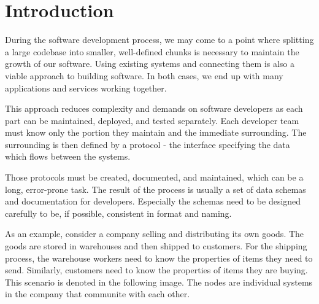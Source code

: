 \chapter*{Introduction}

During the software development process, we may come to a point where splitting a large codebase into smaller, well-defined chunks is necessary to maintain the growth of our software. Using existing systems and connecting them is also a viable approach to building software. In both cases, we end up with many applications and services working together.

This approach reduces complexity and demands on software developers as each part can be maintained, deployed, and tested separately. Each developer team must know only the portion they maintain and the immediate surrounding. The surrounding is then defined by a protocol - the interface specifying the data which flows between the systems.

Those protocols must be created, documented, and maintained, which can be a long, error-prone task. The result of the process is usually a set of data schemas and documentation for developers. Especially the schemas need to be designed carefully to be, if possible, consistent in format and naming.

\bigskip

As an example, consider a company selling and distributing its own goods. The goods are stored in warehouses and then shipped to customers. For the shipping process, the warehouse workers need to know the properties of items they need to send. Similarly, customers need to know the properties of items they are buying. This scenario is denoted in the following image. The nodes are individual systems in the company that communite with each other.

\begin{figure}[h]\centering
{}
\end{figure}

